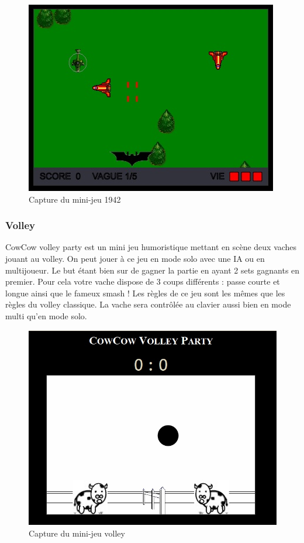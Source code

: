 \begin{figure}
 \includegraphics[width=\linewidth]{img/capturejeu_1942}
 \caption{Capture du mini-jeu 1942}
 \label{fig:game_1942}
\end{figure}

\subsubsection{Volley}


CowCow volley party  est un mini jeu humoristique mettant en scène deux vaches jouant au volley.
On peut jouer à ce jeu en mode solo avec une IA ou en multijoueur. 
Le but étant bien sur de gagner la partie en ayant 2 sets gagnants en premier. 
Pour cela votre vache dispose de 3 coups différents : passe courte et longue ainsi que le fameux smash !
Les règles de ce jeu sont les mêmes que les règles du volley classique. La vache sera contrôlée au clavier aussi bien  en mode multi qu’en mode solo.

\begin{figure}
 \includegraphics[width=\linewidth]{img/capturejeu_volleycowcow}
 \caption{Capture du mini-jeu volley}
 \label{fig:game_volley}
\end{figure}

